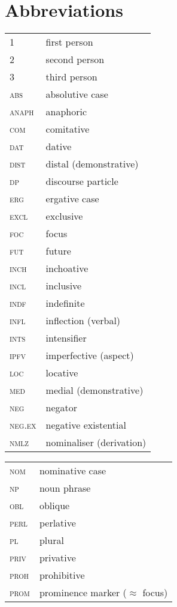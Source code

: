 \documentclass[output=paper,draft,draftmode,colorlinks,citecolor=brown]{langscibook}
\begin{document}
\section*{Abbreviations}
\begin{tabularx}{.5\textwidth}{@{}lQ}
1				&first person\\
2 				&second person\\
3 				&third person\\
{\textsc{abs}}&absolutive case\\
{\textsc{anaph}}&anaphoric\\
{\textsc{com}}&comitative\\
{\textsc{dat}}&dative\\
{\textsc{dist}}&distal (demonstrative)\\
{\textsc{dp}}&discourse particle\\
{\textsc{erg}}&ergative case\\
{\textsc{excl}}&exclusive\\
{\textsc{foc}}&focus\\
{\textsc{fut}}&future\\
{\textsc{inch}}&inchoative\\
{\textsc{incl}}&inclusive\\
{\textsc{indf}}&indefinite\\
{\textsc{infl}}&inflection (verbal)\\
{\textsc{ints}}&intensifier\\
{\textsc{ipfv}}&imperfective (aspect)\\
{\textsc{loc}}&locative\\
{\textsc{med}}&medial (demonstrative)\\
{\textsc{neg}}&negator\\
{\textsc{neg.ex}}&negative existential\\
{\textsc{nmlz}}&nominaliser (derivation)\\
\end{tabularx}\begin{tabularx}{.5\textwidth}{lQ@{}}
{\textsc{nom}}&nominative case\\
{\textsc{np}}&noun phrase\\
{\textsc{obl}}&oblique\\
{\textsc{perl}}&perlative\\
{\textsc{pl}}&plural\\
{\textsc{priv}}&privative\\
{\textsc{proh}}&prohibitive\\
{\textsc{prom}}&prominence marker ($\approx$ focus)\\

\end{tabularx}
\end{document}
